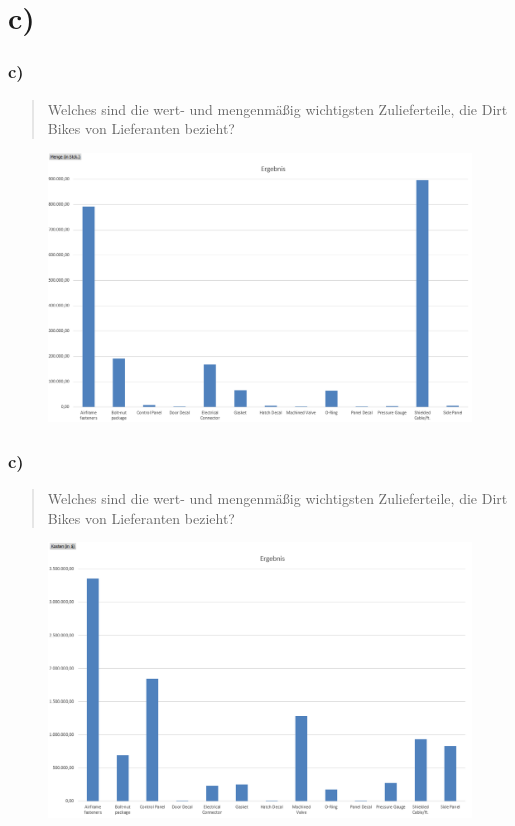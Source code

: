 \documentclass{beamer}
\begin{document}
\section{c)}
\begin{frame}
\frametitle{c)}

\begin{quote}
Welches sind die wert- und mengenm\"aßig wichtigsten Zulieferteile, die Dirt Bikes von Lieferanten bezieht?
\end{quote}

\begin{figure}
\includegraphics[scale=0.34]{pivot_itemNO_quantity.PNG}
\end{figure}

\end{frame}

\begin{frame}
\frametitle{c)}

\begin{quote}
Welches sind die wert- und mengenm\"aßig wichtigsten Zulieferteile, die Dirt Bikes von Lieferanten bezieht?
\end{quote}

\begin{figure}
\includegraphics[scale=0.34]{pivot_itemNO_costs.PNG}
\end{figure}

\end{frame}
\end{document}
